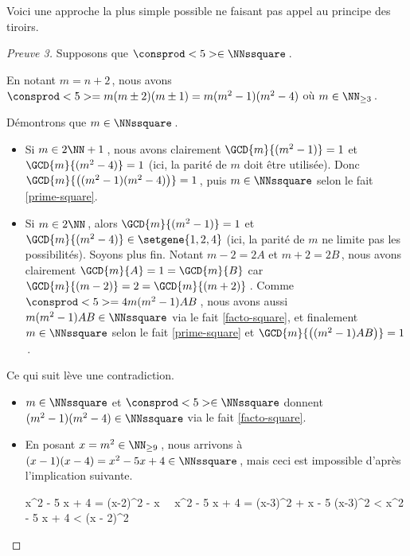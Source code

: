 Voici une approche la plus simple possible ne faisant pas appel au principe des tiroirs.


\begin{proof}[Preuve 3]
	Supposons que $\consprod<5> \in \NNssquare$\,.
    
    \smallskip
    
	En notant $m = n+2$\,, nous avons $\consprod<5> = m (m \pm 2) (m \pm 1) = m (m^2 - 1) (m^2 - 4)$ où $m \in \NN_{\geq 3}$\,.
    
    \medskip
    
    Démontrons que $m \in \NNssquare$\,.
	\begin{itemize}
		\item Si $m \in 2 \NN + 1$\,, nous avons clairement $\GCD{m}{(m^2 - 1)} = 1$ et $\GCD{m}{(m^2 - 4)} = 1$ (ici, la parité de $m$ doit être utilisée).
		Donc $\GCD{m}{\big( (m^2 - 1) (m^2 - 4) \big)} = 1$\,, puis $m \in \NNssquare$ selon le fait \ref{prime-square}.

		\item Si $m \in 2 \NN$\,, alors $\GCD{m}{(m^2 - 1)} = 1$ et $\GCD{m}{(m^2 - 4)} \in \setgene{1, 2, 4}$ (ici, la parité de $m$ ne limite pas les possibilités). Soyons plus fin.
		Notant $m - 2 = 2A$ et $m + 2 = 2B$\,, nous avons clairement $\GCD{m}{A} = 1 = \GCD{m}{B}$ car $\GCD{m}{(m - 2)} = 2 = \GCD{m}{(m + 2)}$\,.
		Comme $\consprod<5> = 4 m (m^2 - 1) A B$\,, nous avons aussi $m (m^2 - 1) A B \in \NNssquare$ via le fait \ref{facto-square}, et finalement $m \in \NNssquare$ selon le fait \ref{prime-square} et $\GCD{m}{\big( (m^2 - 1) A B \big)} = 1$\,. 
	\end{itemize}
    
    \medskip
    
    Ce qui suit lève une contradiction.
	\begin{itemize}
		\item $m \in \NNssquare$ et $\consprod<5> \in \NNssquare$ donnent $(m^2 - 1) (m^2 - 4) \in \NNssquare$ via le fait \ref{facto-square}. 

		\item En posant $x = m^2 \in \NN_{\geq 9}$\,, nous arrivons à $(x - 1) (x - 4) = x^2 - 5 x + 4 \in \NNssquare$\,, mais ceci est impossible d'après l'implication suivante.
		
		\noindent\kern-10pt%
		\begin{stepcalc}[style=ar*, ope={\implies}]
			x^2 - 5 x + 4 = (x-2)^2 - x
			\,\,\,\,
			x^2 - 5 x + 4 = (x-3)^2 + x - 5
			(x-3)^2 < x^2 - 5 x + 4 < (x - 2)^2
		\end{stepcalc}
	\end{itemize}

    \vspace{-1.5ex}
    \qedhere
\end{proof}


